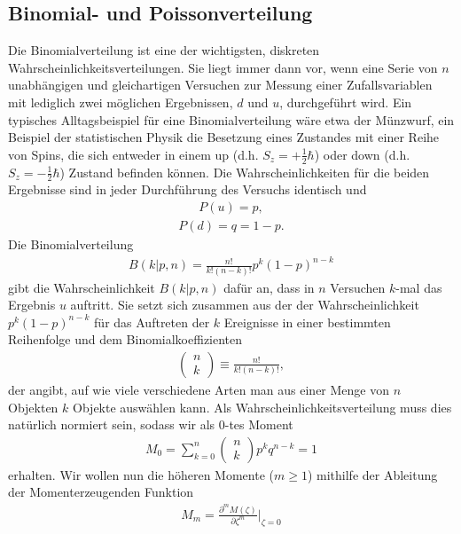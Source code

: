 \subsection{Binomial- und Poissonverteilung}
Die Binomialverteilung ist eine der wichtigsten, diskreten Wahrscheinlichkeitsverteilungen. Sie liegt immer dann vor, wenn eine Serie von $n$ unabhängigen und gleichartigen Versuchen zur Messung einer Zufallsvariablen mit lediglich zwei möglichen Ergebnissen, $d$ und $u$, durchgeführt wird. Ein typisches Alltagsbeispiel für eine Binomialverteilung wäre etwa der Münzwurf, ein Beispiel der statistischen Physik die Besetzung eines Zustandes mit einer Reihe von Spins, die sich entweder in einem \glqq up\grqq{} (d.h. $S_z = +\frac{1}{2}\hbar$) oder \glqq down\grqq{} (d.h. $S_z = -\frac{1}{2}\hbar$) Zustand befinden können. Die Wahrscheinlichkeiten für die beiden Ergebnisse sind in jeder Durchführung des Versuchs identisch und  
\begin{align}
P(u) = p,
\end{align}
\begin{align}
P(d) = q = 1-p.
\end{align}
Die Binomialverteilung 
\begin{align}
B(k|p, n) = \frac{ n! }{ k! (n - k)! }p^k (1-p)^{n-k}
\end{align}
gibt die Wahrscheinlichkeit $B(k|p, n)$ dafür an, dass in $n$ Versuchen $k$-mal das Ergebnis $u$ auftritt. Sie setzt sich zusammen aus der der Wahrscheinlichkeit $p^k (1-p)^{n-k}$ für das Auftreten der $k$ Ereignisse in einer bestimmten Reihenfolge und dem Binomialkoeffizienten
\begin{align}
\begin{pmatrix} n\\ k \end{pmatrix} \equiv \frac{ n! }{ k! (n - k)! },
\end{align}
der angibt, auf wie viele verschiedene Arten man aus einer Menge von $n$ Objekten $k$ Objekte auswählen kann. Als Wahrscheinlichkeitsverteilung muss dies natürlich normiert sein, sodass wir als 0-tes Moment 
\begin{align}
M_0 = \sum_{k = 0}^n \begin{pmatrix} n\\ k \end{pmatrix} p^k q^{n-k} = 1
\end{align}
erhalten.  Wir wollen nun die höheren Momente ($m \geq 1$) mithilfe der Ableitung der Momenterzeugenden Funktion
\begin{align}
M_m = \frac{ \partial^m M (\zeta) }{ \partial \zeta^m} \bigg|_{\zeta = 0}
\end{align}
